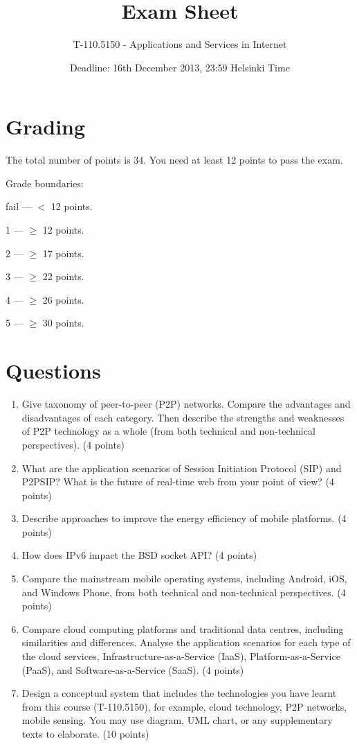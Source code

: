 \documentclass{article}
\title{\vspace{-10pt}Exam Sheet}
\author{T-110.5150 - Applications and Services in Internet}
\date{Deadline: 16th December 2013, 23:59 Helsinki Time}
\begin{document}
\maketitle

\section*{Grading}
\noindent
The total number of points is 34.
You need at least 12 points to pass the exam.

\noindent
Grade boundaries:
\vskip 10pt

fail --- $<$ 12 points.

1 --- $\ge$ 12 points.

2 --- $\ge$ 17 points.

3 --- $\ge$ 22 points.

4 --- $\ge$ 26 points.

5 --- $\ge$ 30 points.

\section*{Questions}

\begin{enumerate}

\item Give taxonomy of peer-to-peer (P2P) networks. Compare the advantages and disadvantages of each category. Then describe the strengths and weaknesses of P2P technology as a whole (from both technical and non-technical perspectives). (4 points)

\item What are the application scenarios of Session Initiation Protocol (SIP) and P2PSIP? What is the future of real-time web from your point of view? (4 points)

\item Describe approaches to improve the energy efficiency of mobile platforms. (4 points)

\item How does IPv6 impact the BSD socket API? (4 points)

\item Compare the mainstream mobile operating systems, including Android, iOS, and Windows Phone, from both technical and non-technical perspectives. (4 points)

\item Compare cloud computing platforms and traditional data centres, including similarities and differences. Analyse the application scenarios for each type of the cloud services, Infrastructure-as-a-Service (IaaS), Platform-as-a-Service (PaaS), and Software-as-a-Service (SaaS). (4 points)

\item Design a conceptual system that includes the technologies you have learnt from this course (T-110.5150), for example, cloud technology, P2P networks, mobile sensing. You may use diagram, UML chart, or any supplementary texts to elaborate. (10 points)

\end{enumerate}
\end{document}
